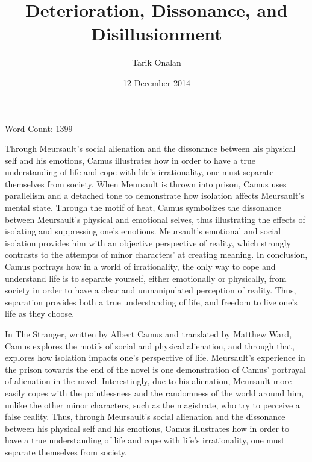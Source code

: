 \documentclass[12pt,a4paper]{article}
\title{Deterioration, Dissonance, and Disillusionment}
\date{12 December 2014}
\author{Tarik Onalan}
\begin{document}
    \maketitle
    \centerline{Word Count: 1399}
    Through Meursault's social alienation and the dissonance between his
    physical self and his emotions, Camus illustrates how in order to have a true
    understanding of life and cope with life's irrationality, one must separate
    themselves from society. When Meursault is thrown
    into prison, Camus uses parallelism and a detached tone to demonstrate how isolation
    affects Meursault's mental state. Through the motif of heat, Camus symbolizes
    the dissonance between Meursault's physical and emotional selves, thus illustrating
    the effects of isolating and suppressing one's emotions. Meursault's emotional
    and social isolation provides him with an objective perspective of reality, which
    strongly contrasts to the attempts of minor characters' at creating meaning.
    In conclusion, Camus portrays how in a world of irrationality, the only
    way to cope and understand life is to separate yourself, either
    emotionally or physically, from society in order to have a clear and
    unmanipulated perception of reality. Thus, separation provides both a true understanding
    of life, and freedom to live one's life as they choose.

    \newpage

    In The Stranger, written by Albert Camus and
    translated by Matthew Ward, Camus explores the motifs of social and physical
    alienation, and through that, explores how isolation impacts one's perspective
    of life. Meursault's experience in the prison towards the end of the novel is
    one demonstration of Camus' portrayal of alienation in the novel. Interestingly,
    due to his alienation, Meursault more easily copes with the pointlessness and
    the randomness of the world around him, unlike the other minor characters, such
    as the magistrate, who try to perceive a false reality. Thus, through
    Meursault's social alienation and the dissonance between his physical self and
    his emotions, Camus illustrates how in order to have a true understanding of
    life and cope with life's irrationality, one must separate themselves from
    society. \\
\end{document}
